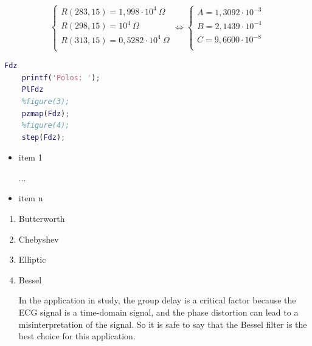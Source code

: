 \begin{equation}
    \begin{cases}
    
        R( 283,15 ) = 1,998\cdot 10^4 ~\Omega \\
        R( 298,15 ) = 10^4 ~\Omega\\
        R( 313,15 ) = 0,5282 \cdot 10^4 ~\Omega\\
    
    \end{cases}
    \Leftrightarrow
    \begin{cases}
        A = 1,3092 \cdot 10^{-3}\\
        B = 2,1439 \cdot 10^{-4}\\
        C = 9,6600 \cdot 10^{-8}\\
    
    \end{cases}
\end{equation}

\begin{lstlisting}[language=Matlab, caption=Matlab code example]
    Fdz
    printf('Polos: ');
    PlFdz
    %figure(3);
    pzmap(Fdz);
    %figure(4);
    step(Fdz);
\end{lstlisting}

\begin{itemize}
    \item item 1
    
    ...
    \item item n 
\end{itemize}

\begin{enumerate}
    \item Butterworth

    \item Chebyshev
    
    \item Elliptic
    
    \item Bessel
    
    In the application in study, the group delay is a critical factor because the ECG signal is a time-domain signal, and the phase distortion can lead to a misinterpretation of the signal. So it is safe to say that the Bessel filter is the best choice for this application.
\end{enumerate}

